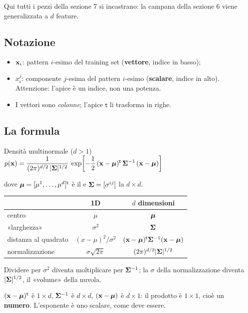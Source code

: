 
Qui tutti i pezzi della sezione 7 si incastrano: la campana della sezione 6 viene generalizzata a $d$ feature.

\subsection{Notazione}
\begin{itemize}
  \item $\mathbf{x}_i$: pattern $i$-esimo del training set (\textbf{vettore}, indice in basso);
  \item $x_i^j$: componente $j$-esima del pattern $i$-esimo (\textbf{scalare}, indice in alto). Attenzione: l'apice è un indice, non una potenza.
  \item I vettori sono \emph{colonne}; l'apice $\mathsf{t}$ li trasforma in righe.
\end{itemize}

\subsection{La formula}
\begin{formulat}{Densità multinormale ($d>1$)}
$\displaystyle p(\mathbf{x})=\frac{1}{(2\pi)^{d/2}\,|\bm{\Sigma}|^{1/2}}\;\exp\!\left[-\frac12\,(\mathbf{x}-\bm{\mu})^{\mathsf{t}}\,\bm{\Sigma}^{-1}\,(\mathbf{x}-\bm{\mu})\right]$
\end{formulat}
dove $\bm{\mu}=[\mu^1,\dots,\mu^d]^{\mathsf{t}}$ è il  e $\bm{\Sigma}=[\sigma^{ij}]$ la  $d\times d$.

\begin{intuizione}
\begin{center}
\begin{tabular}{lcc}
\toprule
& \textbf{1D} & \textbf{$d$ dimensioni}\\
\midrule
centro & $\mu$ & $\bm{\mu}$\\
«larghezza» & $\sigma^2$ & $\bm{\Sigma}$\\
distanza al quadrato & $(x-\mu)^2/\sigma^2$ & $(\mathbf{x}-\bm{\mu})^{\mathsf{t}}\bm{\Sigma}^{-1}(\mathbf{x}-\bm{\mu})$\\
normalizzazione & $\sigma\sqrt{2\pi}$ & $(2\pi)^{d/2}|\bm{\Sigma}|^{1/2}$\\
\bottomrule
\end{tabular}
\end{center}
Dividere per $\sigma^2$ diventa moltiplicare per $\bm{\Sigma}^{-1}$; la $\sigma$ della normalizzazione diventa $|\bm{\Sigma}|^{1/2}$, il «volume» della nuvola.
\end{intuizione}
\begin{tecnica}
$(\mathbf{x}-\bm{\mu})^{\mathsf{t}}$ è $1\times d$, $\bm{\Sigma}^{-1}$ è $d\times d$, $(\mathbf{x}-\bm{\mu})$ è $d\times1$: il prodotto è $1\times1$, cioè un \textbf{numero}. L'esponente è uno scalare, come deve essere.
\end{tecnica}

